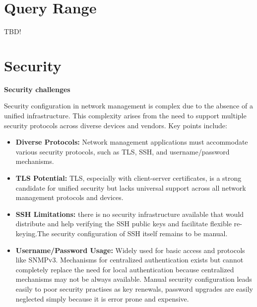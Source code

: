\documentclass[11pt,sigconf]{iabart}
\begin{document}
\section{Query Range} \label{queryrange} 


TBD!

\section{Security} \label{security}



\textbf{Security challenges}

Security configuration in network management is complex due to the absence of a unified infrastructure. This complexity arises from the need to support multiple security protocols across diverse devices and vendors. Key points include:

\begin{itemize}
    \item \textbf{Diverse Protocols:} Network management applications must accommodate various security protocols, such as TLS, SSH, and username/password mechanisms.
    \item \textbf{TLS Potential:} TLS, especially with client-server certificates, is a strong candidate for unified security but lacks universal support across all network management protocols and devices. %
    \item \textbf{SSH Limitations:} there is no security infrastructure available that would distribute and help verifying the SSH public keys and facilitate flexible re-keying.The security configuration of SSH itself remains to be manual.
    \item \textbf{Username/Password Usage:} Widely used for basic access and protocols like SNMPv3. Mechanisms for centralized authentication exists but cannot completely replace the need for local authentication because centralized mechanisms may not be always available. Manual security configuration leads easily to poor security practises as key renewals, password upgrades are easily neglected simply because it is error prone and expensive.

\end{itemize}
 
\end{document}

